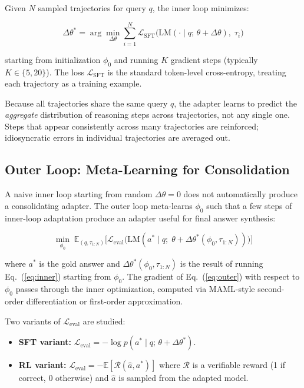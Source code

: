 \documentclass[10pt,twocolumn]{article}
\begin{document}
Given $N$ sampled trajectories for query $q$, the inner loop minimizes:

\begin{equation}
\Delta\theta^* = \arg\min_{\Delta\theta} \sum_{i=1}^{N} \mathcal{L}_{\mathrm{SFT}}\!\bigl(\mathrm{LM}(\cdot \mid q;\,\theta + \Delta\theta),\;\tau_i\bigr)
\label{eq:inner}
\end{equation}

starting from initialization $\phi_0$ and running $K$ gradient steps (typically $K \in \{5,20\}$).
The loss $\mathcal{L}_{\mathrm{SFT}}$ is the standard token-level cross-entropy, treating each trajectory as a training example.

Because all trajectories share the same query $q$, the adapter learns to predict the \emph{aggregate} distribution of reasoning steps across trajectories, not any single one.
Steps that appear consistently across many trajectories are reinforced; idiosyncratic errors in individual trajectories are averaged out.

\subsection*{Outer Loop: Meta-Learning for Consolidation}

A naive inner loop starting from random $\Delta\theta=0$ does not automatically produce a consolidating adapter.
The outer loop meta-learns $\phi_0$ such that a few steps of inner-loop adaptation produce an adapter useful for final answer synthesis:

\begin{equation}
\min_{\phi_0} \;\mathbb{E}_{(q,\tau_{1:N})} \bigl[\mathcal{L}_{\mathrm{eval}}\bigl(\mathrm{LM}(a^* \mid q;\;\theta + \Delta\theta^*(\phi_0,\tau_{1:N}))\bigr)\bigr]
\label{eq:outer}
\end{equation}

where $a^*$ is the gold answer and $\Delta\theta^*(\phi_0,\tau_{1:N})$ is the result of running Eq.~(\ref{eq:inner}) starting from $\phi_0$.
The gradient of Eq.~(\ref{eq:outer}) with respect to $\phi_0$ passes through the inner optimization, computed via MAML-style second-order differentiation or first-order approximation.

Two variants of $\mathcal{L}_{\mathrm{eval}}$ are studied:
\begin{itemize}[leftmargin=1em,itemsep=1pt]
  \item \textbf{SFT variant:} $\mathcal{L}_{\mathrm{eval}} = -\log p(a^* \mid q;\,\theta+\Delta\theta^*)$.
  \item \textbf{RL variant:} $\mathcal{L}_{\mathrm{eval}} = -\mathbb{E}[\mathcal{R}(\hat{a},a^*)]$ where $\mathcal{R}$ is a verifiable reward (1 if correct, 0 otherwise) and $\hat{a}$ is sampled from the adapted model.
\end{itemize}
\end{document}
